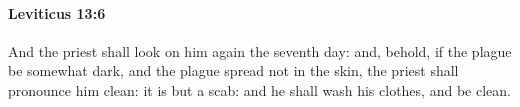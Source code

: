 
		\paragraph{Leviticus 13:6} %
			\label{LEVITICUS-13-6}

			And the priest shall look on him again the seventh day: and, behold, if the plague be somewhat dark, and the plague spread not in the skin, the priest shall pronounce him clean: it is but a scab: and he shall wash his clothes, and be clean.


